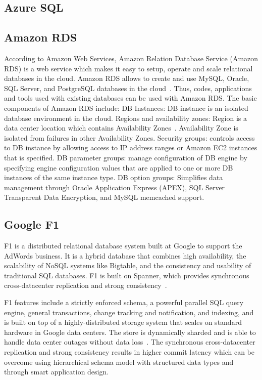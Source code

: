      \pv
      
\subsection{Azure SQL}

\pv 

\subsection{Amazon RDS }

According to Amazon Web Services, Amazon Relation Database Service
(Amazon RDS) is a web service which makes it easy to setup, operate
and scale relational databases in the cloud. Amazon RDS allows to
create and use MySQL, Oracle, SQL Server, and PostgreSQL databases in
the cloud~\cite{www-AmazonRDS}. Thus, codes, applications and tools
used with existing databases can be used with Amazon RDS. The basic
components of Amazon RDS include: DB Instances: DB instance is an
isolated database environment in the cloud. Regions and availability
zones: Region is a data center location which contains Availability
Zones~\cite{www-AmazonRDSComponents}. Availability Zone is isolated
from failures in other Availability Zones. Security groups: controls
access to DB instance by allowing access to IP address ranges or
Amazon EC2 instances that is specified. DB parameter groups: manage
configuration of DB engine by specifying engine configuration values
that are applied to one or more DB instances of the same instance
type. DB option groups: Simplifies data management through Oracle
Application Express (APEX), SQL Server Transparent Data Encryption,
and MySQL memcached support.

     \pv

     
\subsection{Google F1}

F1 is a distributed relational database system built at Google to
support the AdWords business. It is a hybrid database that combines
high availability, the scalability of NoSQL systems like Bigtable, and
the consistency and usability of traditional SQL databases. F1 is
built on Spanner, which provides synchronous cross-datacenter
replication and strong consistency~\cite{paper-F1}.
     
F1 features include a strictly enforced schema, a powerful parallel
SQL query engine, general transactions, change tracking and
notification, and indexing, and is built on top of a
highly-distributed storage system that scales on standard hardware in
Google data centers. The store is dynamically sharded and is able to
handle data center outages without data loss~\cite{paper-RDBMS}. The
synchronous cross-datacenter replication and strong consistency
results in higher commit latency which can be overcome using
hierarchical schema model with structured data types and through smart
application design.
     


